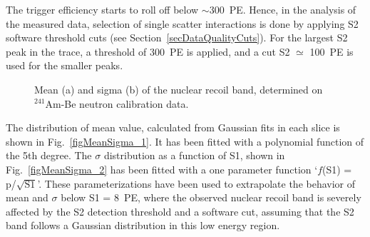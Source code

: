 The trigger efficiency starts to roll off below $\sim$300~PE. Hence, in the analysis of the measured data, selection of single scatter interactions is done by applying S2 software threshold cuts (see Section~\ref{secDataQualityCuts}). For the largest S2 peak in the trace, a threshold of 300~PE is applied, and a cut S2 $\simeq$ 100~PE is used for the smaller peaks.

\begin{figure}[!b]
\centering
{}
\caption[Mean and sigma of the nuclear recoil band, determined on $^{241}$Am-Be neutron calibration data]{Mean (a) and sigma (b) of the nuclear recoil band, determined on $^{241}$Am-Be neutron calibration data.}
\label{figMeanSigma}
\end{figure}

The distribution of mean value, calculated from Gaussian fits in each slice is shown in Fig.~\ref{figMeanSigma_1}. It has been fitted with a polynomial function of the 5th degree. The $\sigma$ distribution as a function of S1, shown in Fig.~\ref{figMeanSigma_2} has been fitted with a one parameter function `$f$(S1) = p/$\sqrt{\mathrm{S1}}$'. These parameterizations have been used to extrapolate the behavior of mean and $\sigma$ below S1 = 8~PE, where the observed nuclear recoil band is severely affected by the S2 detection threshold and a software cut, assuming that the S2 band follows a Gaussian distribution in this low energy region.

